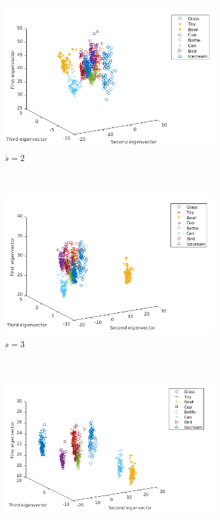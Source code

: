 \documentclass[10pt,a4paper]{article}
\theoremstyle{plain}
\theoremstyle{definition}
\begin{document}
\begin{figure}[H]
	\centering
	\begin{subfigure}[b]{0.5\textwidth}
		\includegraphics[width= \textwidth]{images/Mellin-s2.png}
		\caption{$s=2$}
		\label{}
	\end{subfigure}~
	\begin{subfigure}[b]{0.5\textwidth}
		\includegraphics[width= \textwidth]{images/Mellin-s3.png}
		\caption{$s=3$}
		\label{}
	\end{subfigure}\\
	\begin{subfigure}[b]{0.5\textwidth}
		\includegraphics[width= \textwidth]{images/Mellin-s5.png}

\end{subfigure}
\end{figure}
\end{document}
